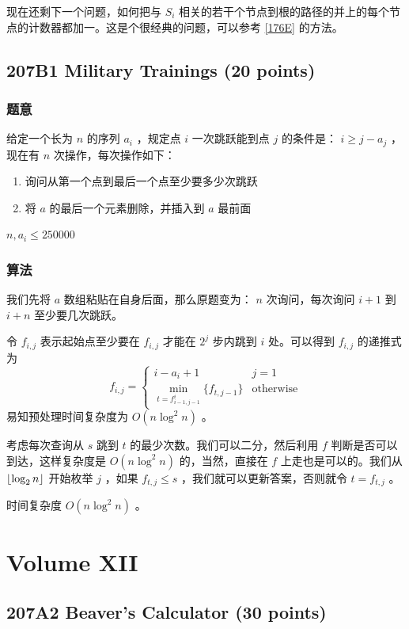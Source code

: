 \documentclass[11pt]{article}
\begin{document}
    现在还剩下一个问题，如何把与 $S_i$ 相关的若干个节点到根的路径的并上的每个节点的计数器都加一。这是个很经典的问题，可以参考 \ref{176E} 的方法。
\subsection{207B1 Military Trainings (20 points)}
\label{sec-11-9}
\subsubsection{题意}
\label{sec-11-9-1}

给定一个长为 $n$ 的序列 $a_i$ ，规定点 $i$ 一次跳跃能到点 $j$ 的条件是： $i \geq j - a_j$ ，现在有 $n$ 次操作，每次操作如下：
\begin{enumerate}
\item 询问从第一个点到最后一个点至少要多少次跳跃
\item 将 $a$ 的最后一个元素删除，并插入到 $a$ 最前面
\end{enumerate}

$n, a_i \leq 250000$
\subsubsection{算法}
\label{sec-11-9-2}

我们先将 $a$ 数组粘贴在自身后面，那么原题变为： $n$ 次询问，每次询问 $i + 1$ 到 $i + n$ 至少要几次跳跃。

令 $f_{i, j}$ 表示起始点至少要在 $f_{i, j}$ 才能在 $2^j$ 步内跳到 $i$ 处。可以得到 $f_{i, j}$ 的递推式为
$$f_{i, j} = \begin{cases} i - a_i + 1 & j = 1 \\ \min_{t = f_{i - 1, j - 1}^i} \{ f_{t, j - 1} \} & \text{otherwise} \end{cases}$$
易知预处理时间复杂度为 $O(n \log^2 n)$ 。

考虑每次查询从 $s$ 跳到 $t$ 的最少次数。我们可以二分，然后利用 $f$ 判断是否可以到达，这样复杂度是 $O(n \log^2 n)$ 的，当然，直接在 $f$ 上走也是可以的。我们从 ${\lfloor \log_2 n \rfloor}$ 开始枚举 $j$ ，如果 $f_{t, j} \leq s$ ，我们就可以更新答案，否则就令 $t = f_{t, j}$ 。

时间复杂度 $O(n \log^2 n)$ 。
\section{Volume XII}
\label{sec-12}
\subsection{207A2 Beaver's Calculator (30 points)}
\label{sec-12-1}
\end{document}
